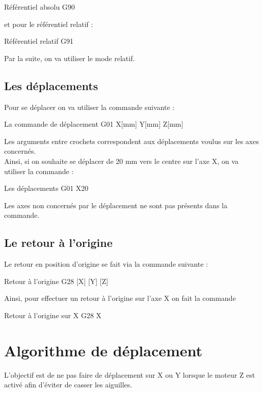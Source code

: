 \begin{Cpp}{Référentiel absolu}
G90
\end{Cpp}
et pour le référentiel relatif : 
\begin{Cpp}{Référentiel relatif}
G91
\end{Cpp}

Par la suite, on va utiliser le mode relatif.

\section{Les déplacements}

Pour se déplacer on va utiliser la commande suivante : 

\begin{Cpp}{La commande de déplacement}
G01 X[mm] Y[mm] Z[mm]
\end{Cpp}

Les arguments entre crochets correspondent aux déplacements voulus sur les axes concernés.\\
Ainsi, si on souhaite se déplacer de 20 mm vers le centre sur l'axe X, on va utiliser la commande : 

\begin{Cpp}{Les déplacements}
G01 X20
\end{Cpp}

Les axes non concernés par le déplacement ne sont pas présents dans la commande.

\section{Le retour à l'origine}

Le retour en position d'origine se fait via la commande suivante : 

\begin{Cpp}{Retour à l'origine}
G28 [X] [Y] [Z]
\end{Cpp}

Ainsi, pour effectuer un retour à l'origine sur l'axe X on fait la commande 

\begin{Cpp}{Retour à l'origine sur X}
G28 X
\end{Cpp}

\chapter{Algorithme de déplacement}

L'objectif est de ne pas faire de déplacement sur X ou Y lorsque le moteur Z est activé afin d'éviter de casser les aiguilles.


